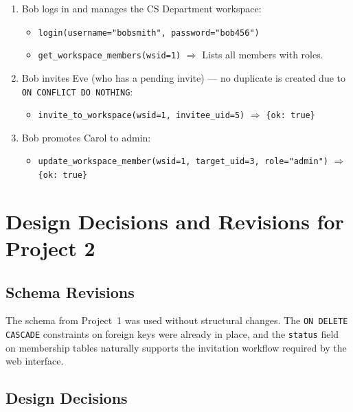 \documentclass[11pt]{article}
\begin{document}
\begin{enumerate}
    \item Bob logs in and manages the CS Department workspace:
    \begin{itemize}
        \item \texttt{login(username="bobsmith", password="bob456")}
        \item \texttt{get\_workspace\_members(wsid=1)} $\Rightarrow$ Lists all members with roles.
    \end{itemize}

    \item Bob invites Eve (who has a pending invite) --- no duplicate is created due to \texttt{ON CONFLICT DO NOTHING}:
    \begin{itemize}
        \item \texttt{invite\_to\_workspace(wsid=1, invitee\_uid=5)} $\Rightarrow$ \texttt{\{ok: true\}}
    \end{itemize}

    \item Bob promotes Carol to admin:
    \begin{itemize}
        \item \texttt{update\_workspace\_member(wsid=1, target\_uid=3, role="admin")} $\Rightarrow$ \texttt{\{ok: true\}}
    \end{itemize}
\end{enumerate}


\newpage
\section{Design Decisions and Revisions for Project 2}
\label{sec:revisions}

\subsection{Schema Revisions}

The schema from Project~1 was used without structural changes. The \texttt{ON DELETE CASCADE} constraints on foreign keys were already in place, and the \texttt{status} field on membership tables naturally supports the invitation workflow required by the web interface.

\subsection{Design Decisions}
\end{document}

